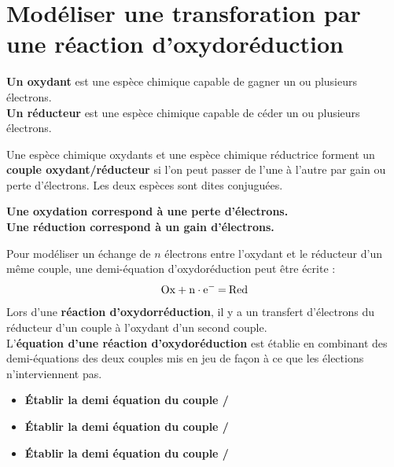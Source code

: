 \documentclass[a4paper,12pt,fleqn]{article}%
\begin{document}
\maketitle
\section*{Modéliser une transforation par une réaction d'oxydoréduction}

\begin{cours}
    \textbf{Un oxydant} est une espèce chimique capable de gagner un ou plusieurs électrons.\\
    \textbf{Un réducteur} est une espèce chimique capable de céder un ou plusieurs électrons.
\end{cours}
Une espèce chimique oxydants et une espèce chimique réductrice forment un \textbf{couple oxydant/réducteur} si l'on peut passer de l'une à l'autre par gain ou perte d'électrons. Les deux espèces sont dites conjuguées.
\begin{figure}[h!]
    \centering
\end{figure}
\begin{cours}
    \textbf{Une oxydation correspond à une perte d'électrons.}\\
    \textbf{Une réduction correspond à un gain d'électrons.}
\end{cours}
Pour modéliser un échange de $n$ électrons entre l'oxydant et le réducteur d'un même couple, une demi-équation d'oxydoréduction peut être écrite :
$$\ce{Ox + n\cdot e^{-} = Red}$$
Lors d'une \textbf{réaction d'oxydorréduction}, il y a un transfert d'électrons du réducteur d'un couple à l'oxydant d'un second couple.\\
L'\textbf{équation d'une réaction d'oxydoréduction} est établie en combinant des demi-équations des deux couples mis en jeu de façon à ce que les élections n'interviennent pas.

\begin{exemple}
    \begin{itemize}
        \item \textbf{Établir la demi équation du couple /}
        \item \textbf{Établir la demi équation du couple /}
        \item \textbf{Établir la demi équation du couple /}
    \end{itemize}
\end{exemple}
\end{document}
